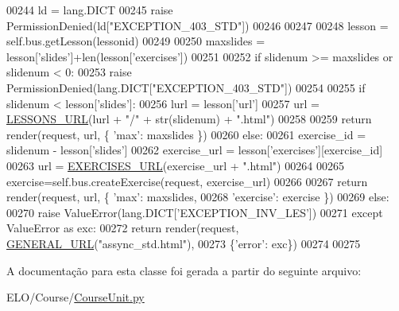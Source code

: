 \begin{DoxyCode}
00244                             ld = lang.DICT
00245                             \textcolor{keywordflow}{raise} PermissionDenied(ld[\textcolor{stringliteral}{"EXCEPTION\_403\_STD"}])
00246                         
00247 
00248                     lesson = self.bus.getLesson(lessonid)
00249 
00250                     maxslides = lesson[\textcolor{stringliteral}{'slides'}]+len(lesson[\textcolor{stringliteral}{'exercises'}])
00251 
00252                     \textcolor{keywordflow}{if} slidenum >= maxslides \textcolor{keywordflow}{or} slidenum < 0:
00253                         \textcolor{keywordflow}{raise} PermissionDenied(lang.DICT[\textcolor{stringliteral}{"EXCEPTION\_403\_STD"}])
00254 
00255                     \textcolor{keywordflow}{if} slidenum < lesson[\textcolor{stringliteral}{'slides'}]:
00256                         lurl = lesson[\textcolor{stringliteral}{'url'}]
00257                         url = \hyperlink{namespaceCourse_1_1macros_a4473a418de016b59cce33b13440e469b}{LESSONS\_URL}(lurl + \textcolor{stringliteral}{"/"} + str(slidenum) + \textcolor{stringliteral}{".html"})
00258 
00259                         \textcolor{keywordflow}{return} render(request, url, \{ \textcolor{stringliteral}{'max'}: maxslides \})
00260                     \textcolor{keywordflow}{else}:
00261                         exercise\_id = slidenum - lesson[\textcolor{stringliteral}{'slides'}]
00262                         exercise\_url = lesson[\textcolor{stringliteral}{'exercises'}][exercise\_id]
00263                         url = \hyperlink{namespaceCourse_1_1macros_ac1cf8b3a78128ab6a3bac4f6be9fabbd}{EXERCISES\_URL}(exercise\_url + \textcolor{stringliteral}{".html"})
00264 
00265                         exercise=self.bus.createExercise(request, exercise\_url)
00266 
00267                         \textcolor{keywordflow}{return} render(request, url, \{ \textcolor{stringliteral}{'max'}: maxslides,
00268                                                       \textcolor{stringliteral}{'exercise'}: exercise \})
00269                 \textcolor{keywordflow}{else}:
00270                     \textcolor{keywordflow}{raise} ValueError(lang.DICT[\textcolor{stringliteral}{'EXCEPTION\_INV\_LES'}])
00271             \textcolor{keywordflow}{except} ValueError \textcolor{keyword}{as} exc:
00272                 \textcolor{keywordflow}{return} render(request, \hyperlink{namespaceCourse_1_1macros_a9a69c2455c0c121b1c01960629575d7e}{GENERAL\_URL}(\textcolor{stringliteral}{"assync\_std.html"}),
00273                         \{\textcolor{stringliteral}{'error'}: exc\})
00274                 
00275 
\end{DoxyCode}


A documentação para esta classe foi gerada a partir do seguinte arquivo\+:\begin{DoxyCompactItemize}
\item 
E\+L\+O/\+Course/\hyperlink{CourseUnit_8py}{Course\+Unit.\+py}\end{DoxyCompactItemize}

